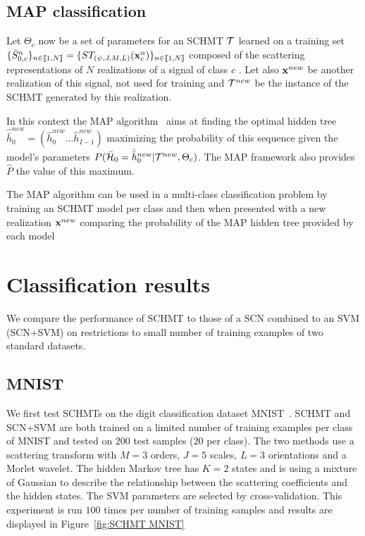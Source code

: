 \documentclass{article}
\begin{document}
	\subsection{MAP classification}
    \label{subsec:SCN/SCC}
    
     Let $\Theta_{c}$ now be a set of parameters for an SCHMT $\mathcal{T}$ learned on a training set $\{\bar{S}_{0,c}^n\}_{n \in \llbracket1, N \rrbracket} = \{ST_{(\psi, J, M, L)}({\bf x}_{c}^{n})\}_{n \in \llbracket1, N \rrbracket}$ composed of the scattering representations of $N$ realizations of a signal of class $c$ . Let also ${\bf x}^{new}$ be another realization of this signal, not used for training and $\mathcal{T}^{new}$ be the instance of the SCHMT generated by this realization.
     
     In this context the MAP algorithm~\cite{durand2001statistical} aims at finding the optimal hidden tree $\hat{\bar{h}}_{0}^{new}=(\hat{h}_{0}^{new} \dots \hat{h}_{I-1}^{new})$ maximizing the probability of this sequence given the model's parameters $P(\bar{\mathcal{H}}_{0}= \hat{\bar{h}}_{0}^{new}|\mathcal{T}^{new},\Theta_{c})$. The MAP framework also provides $\hat{P}$ the value of this maximum.
    
    The MAP algorithm can be used in a multi-class classification problem by training an SCHMT model per class and then when presented with a new realization ${\bf x}^{new}$ comparing the probability of the MAP hidden tree provided by each model
    
\section{Classification results}
  \label{sec:Exps}
  
  We compare the performance of SCHMT to those of a SCN combined to an SVM (SCN+SVM) on restrictions to small number of training examples of two standard datasets. 
  
  \subsection{MNIST}
		\label{subsec:Exps/MNIST}
		We first test SCHMTs on the digit classification dataset MNIST~\cite{lecun2016web}. SCHMT and SCN+SVM are both trained on a limited number of training examples per class of MNIST and tested on $200$ test samples ($20$ per class). The two methods use a scattering transform with $M=3$ orders, $J=5$ scales, $L=3$ orientations and a Morlet wavelet. The hidden Markov tree has $K=2$ states and is using a mixture of Gaussian to describe the relationship between the scattering coefficients and the hidden states. The SVM parameters are selected by cross-validation. This experiment is run $100$ times per number of training samples and results are displayed in Figure~\ref{fig:SCHMT MNIST} 
\end{document}
